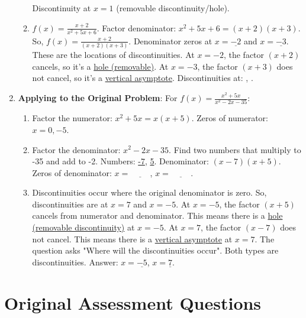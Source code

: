 \documentclass[12pt]{article}
\begin{document}
\begin{enumerate}[label=35.\arabic*]
\begin{enumerate}[label=\alph*)]
        Discontinuity at \(x=1\) (removable discontinuity/hole).
        \item \( f(x) = \frac{x + 2}{x^2 + 5x + 6} \).
        Factor denominator: \(x^2 + 5x + 6 = (x+2)(x+3)\).
        So, \( f(x) = \frac{x+2}{(x+2)(x+3)} \).
        Denominator zeros at \(x = \underline{-2}\) and \(x = \underline{-3}\). These are the locations of discontinuities.
        At \(x=-2\), the factor \((x+2)\) cancels, so it's a \underline{hole (removable)}.
        At \(x=-3\), the factor \((x+3)\) does not cancel, so it's a \underline{vertical asymptote}.
        Discontinuities at: \underline{\hspace{1cm}}, \underline{\hspace{1cm}}.
    \end{enumerate}
    \item \textbf{Applying to the Original Problem}: For \( f(x) = \frac{x^2 + 5x}{x^2 - 2x - 35} \):
    \begin{enumerate}[label=\alph*)]
        \item Factor the numerator: \( x^2 + 5x = x(x + 5) \). Zeros of numerator: \( x = 0, -5 \).
        \item Factor the denominator: \( x^2 - 2x - 35 \). Find two numbers that multiply to -35 and add to -2. Numbers: \underline{-7}, \underline{5}.
        Denominator: \((x - 7)(x + 5) \). Zeros of denominator: \( x = \underline{\hspace{1cm}} \), \( x = \underline{\hspace{1cm}} \).
        \item Discontinuities occur where the original denominator is zero.
        So, discontinuities are at \( x = 7 \) and \( x = -5 \).
        At \( x = -5 \), the factor \( (x + 5) \) cancels from numerator and denominator. This means there is a \underline{hole (removable discontinuity)} at \( x = -5 \).
        At \( x = 7 \), the factor \( (x - 7) \) does not cancel. This means there is a \underline{vertical asymptote} at \( x = 7 \).
        The question asks "Where will the discontinuities occur". Both types are discontinuities.
        Answer: \( x = \underline{-5} \), \( x = \underline{7} \).
    \end{enumerate}
\end{enumerate}

\section*{Original Assessment Questions}
\end{document}
